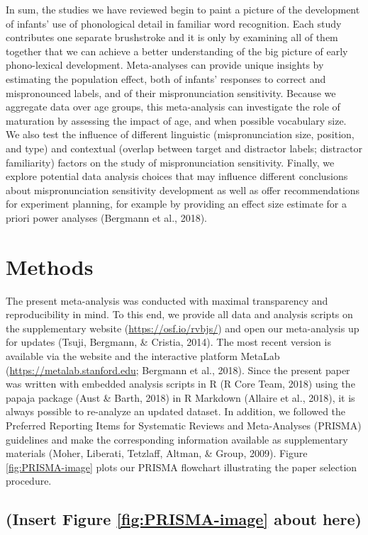 \documentclass[man]{apa6}
\begin{document}
In sum, the studies we have reviewed begin to paint a picture of the development of infants' use of phonological detail in familiar word recognition. Each study contributes one separate brushstroke and it is only by examining all of them together that we can achieve a better understanding of the big picture of early phono-lexical development. Meta-analyses can provide unique insights by estimating the population effect, both of infants' responses to correct and mispronounced labels, and of their mispronunciation sensitivity. Because we aggregate data over age groups, this meta-analysis can investigate the role of maturation by assessing the impact of age, and when possible vocabulary size. We also test the influence of different linguistic (mispronunciation size, position, and type) and contextual (overlap between target and distractor labels; distractor familiarity) factors on the study of mispronunciation sensitivity. Finally, we explore potential data analysis choices that may influence different conclusions about mispronunciation sensitivity development as well as offer recommendations for experiment planning, for example by providing an effect size estimate for a priori power analyses (Bergmann et al., 2018).

\hypertarget{methods}{%
\section{Methods}\label{methods}}

The present meta-analysis was conducted with maximal transparency and reproducibility in mind. To this end, we provide all data and analysis scripts on the supplementary website (\url{https://osf.io/rvbjs/}) and open our meta-analysis up for updates (Tsuji, Bergmann, \& Cristia, 2014). The most recent version is available via the website and the interactive platform MetaLab (\url{https://metalab.stanford.edu}; Bergmann et al., 2018). Since the present paper was written with embedded analysis scripts in R (R Core Team, 2018) using the papaja package (Aust \& Barth, 2018) in R Markdown (Allaire et al., 2018), it is always possible to re-analyze an updated dataset. In addition, we followed the Preferred Reporting Items for Systematic Reviews and Meta-Analyses (PRISMA) guidelines and make the corresponding information available as supplementary materials (Moher, Liberati, Tetzlaff, Altman, \& Group, 2009). Figure \ref{fig:PRISMA-image} plots our PRISMA flowchart illustrating the paper selection procedure.

\hypertarget{insert-figure-reffigprisma-image-about-here}{%
\subsection{(Insert Figure \ref{fig:PRISMA-image} about here)}\label{insert-figure-reffigprisma-image-about-here}}
\end{document}
